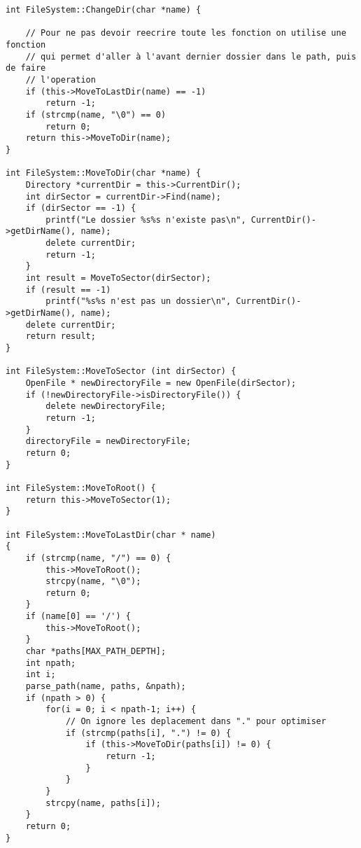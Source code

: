 \documentclass[a4paper,10pt]{article}
\begin{document}
\begin{lstlisting}
int FileSystem::ChangeDir(char *name) {

    // Pour ne pas devoir reecrire toute les fonction on utilise une fonction
    // qui permet d'aller à l'avant dernier dossier dans le path, puis de faire
    // l'operation
    if (this->MoveToLastDir(name) == -1)
        return -1;
    if (strcmp(name, "\0") == 0)
        return 0;
    return this->MoveToDir(name);
}

int FileSystem::MoveToDir(char *name) {
    Directory *currentDir = this->CurrentDir();
    int dirSector = currentDir->Find(name);
    if (dirSector == -1) {
        printf("Le dossier %s%s n'existe pas\n", CurrentDir()->getDirName(), name);
        delete currentDir;
        return -1;
    }
    int result = MoveToSector(dirSector);
    if (result == -1)
        printf("%s%s n'est pas un dossier\n", CurrentDir()->getDirName(), name);
    delete currentDir;
    return result;
}

int FileSystem::MoveToSector (int dirSector) {
    OpenFile * newDirectoryFile = new OpenFile(dirSector);
    if (!newDirectoryFile->isDirectoryFile()) {
        delete newDirectoryFile;
        return -1;
    }
    directoryFile = newDirectoryFile;
    return 0;
}

int FileSystem::MoveToRoot() {
    return this->MoveToSector(1);
}

int FileSystem::MoveToLastDir(char * name)
{
    if (strcmp(name, "/") == 0) {
        this->MoveToRoot();
        strcpy(name, "\0");
        return 0;
    }
    if (name[0] == '/') {
        this->MoveToRoot();
    }
    char *paths[MAX_PATH_DEPTH];
    int npath;
    int i;
    parse_path(name, paths, &npath);
    if (npath > 0) {
        for(i = 0; i < npath-1; i++) {
            // On ignore les deplacement dans "." pour optimiser
            if (strcmp(paths[i], ".") != 0) {
                if (this->MoveToDir(paths[i]) != 0) {
                    return -1;
                }
            }
        }
        strcpy(name, paths[i]);
    }
    return 0;
}


\end{lstlisting}
\end{document}
